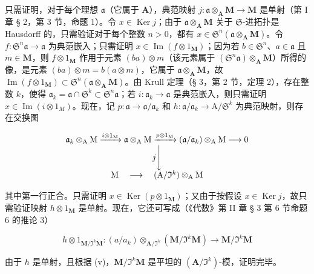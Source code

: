 只需证明，对于每个理想 \(\mathfrak{a}\)（它属于 \(\mathbf{A}\)），典范映射 \(j\colon \mathfrak{a} \otimes_{\mathbf{A}} \mathbf{M} \to \mathbf{M}\) 是单射（第 I 章 § 2，第 3 节，命题 1）。令 \(x \in \operatorname{Ker} j\)；由于 \(\mathfrak{a} \otimes_{\mathbf{A}} \mathbf{M}\) 关于 \(\mathfrak{S}\)-进拓扑是 Hausdorff 的，只需验证对于每个整数 \(n > 0\)，都有 \(x \in \mathfrak{S}^n(\mathfrak{a} \otimes_{\mathbf{A}} \mathbf{M})\)。令 \(f\colon \mathfrak{S}^n\mathfrak{a} \to \mathfrak{a}\) 为典范嵌入；只需证明 \(x \in \operatorname{Im}(f \otimes 1_{\mathbf{M}})\)；因为若 \(b \in \mathfrak{S}^n\)、\(a \in \mathfrak{a}\) 且 \(m \in \mathbf{M}\)，则 \(f \otimes 1_{\mathbf{M}}\) 作用于元素 \((ba) \otimes m\)（该元素属于 \((\mathfrak{S}^n\mathfrak{a}) \otimes_{\mathbf{A}} \mathbf{M}\)）所得的像，是元素 \((ba) \otimes m = b(a \otimes m)\)，它属于 \(\mathfrak{a} \otimes_{\mathbf{A}} \mathbf{M}\)，故 \(\operatorname{Im}(f \otimes 1_{\mathbf{M}}) \subset \mathfrak{S}^n(\mathfrak{a} \otimes_{\mathbf{A}} \mathbf{M})\)。由 Krull 定理（§ 3，第 2 节，定理 2），存在整数 \(k\)，使得 \(\mathfrak{a}_k = \mathfrak{a} \cap \mathfrak{S}^k \subset \mathfrak{S}^n\mathfrak{a}\)；若 \(i: \mathfrak{a}_k \to \mathfrak{a}\) 是典范嵌入，则只需证明 \(x \in \operatorname{Im}(i \otimes 1_M)\)。现在，记 \(p: \mathfrak{a} \to \mathfrak{a}/\mathfrak{a}_k\) 和 \(h: \mathfrak{a}/\mathfrak{a}_k \to \mathrm{A}/\mathfrak{S}^k\) 为典范映射，则存在交换图

\[
\begin{array}{c} \mathfrak {a} _ {k} \otimes_ {\mathrm{A}} \mathrm{M} \xrightarrow {i \otimes 1 _ {\mathrm{M}}} \mathfrak {a} \otimes_ {\mathrm{A}} \mathrm{M} \xrightarrow {p \otimes 1 _ {\mathrm{M}}} (\mathfrak {a} / \mathfrak {a} _ {k}) \otimes_ {\mathrm{A}} \mathrm{M} \longrightarrow 0 \\ j \Biggl \downarrow \\ \mathrm{M} \quad \longrightarrow \quad (\mathrm{A} / \mathfrak {I} ^ {k}) \otimes_ {\mathrm{A}} \mathrm{M} \end{array}
\]

其中第一行正合。只需证明 \(x \in \operatorname{Ker}(p \otimes 1_{\mathbf{M}})\)；又由于按假设 \(x \in \operatorname{Ker} j\)，故只需验证映射 \(h \otimes 1_{\mathbf{M}}\) 是单射。现在，它还可写成（《代数》第 II 章 § 3 第 6 节命题 6 的推论 3）

\[
h \otimes 1 _ {\mathbf {M} / \Im^ {k} \mathbf {M}}: (a / a _ {k}) \otimes_ {\mathbf {A} / \Im^ {k}} (\mathbf {M} / \Im^ {k} \mathbf {M}) \rightarrow \mathbf {M} / \Im^ {k} \mathbf {M}
\]

由于 \(h\) 是单射，且根据 (v)，\(\mathbf{M} / \Im^k\mathbf{M}\) 是平坦的 \((\mathbf{A} / \Im^k)\)-模，证明完毕。

